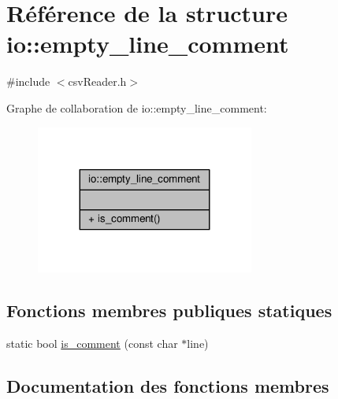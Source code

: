 \hypertarget{structio_1_1empty__line__comment}{}\section{Référence de la structure io\+:\+:empty\+\_\+line\+\_\+comment}
\label{structio_1_1empty__line__comment}


{\ttfamily \#include $<$csv\+Reader.\+h$>$}



Graphe de collaboration de io\+:\+:empty\+\_\+line\+\_\+comment\+:\nopagebreak
\begin{figure}[H]
\begin{center}
\leavevmode
\includegraphics[width=203pt]{structio_1_1empty__line__comment__coll__graph}
\end{center}
\end{figure}
\subsection*{Fonctions membres publiques statiques}
\begin{DoxyCompactItemize}
\item 
static bool \hyperlink{structio_1_1empty__line__comment_a88e2cee044a9aafabf3e2a0e64fa5289}{is\+\_\+comment} (const char $\ast$line)
\end{DoxyCompactItemize}


\subsection{Documentation des fonctions membres}
\mbox{\label{structio_1_1empty__line__comment_a88e2cee044a9aafabf3e2a0e64fa5289}} 
